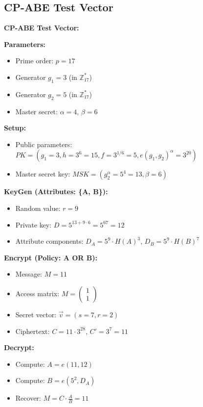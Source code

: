 \documentclass[11pt,a4paper]{article}
\begin{document}
\subsection{CP-ABE Test Vector}

\begin{examplebox}
\textbf{CP-ABE Test Vector:}

\textbf{Parameters:}
\begin{itemize}
    \item Prime order: $p = 17$
    \item Generator $g_1 = 3$ (in $\mathbb{Z}_{17}^*$)
    \item Generator $g_2 = 5$ (in $\mathbb{Z}_{17}^*$)
    \item Master secret: $\alpha = 4$, $\beta = 6$
\end{itemize}

\textbf{Setup:}
\begin{itemize}
    \item Public parameters: $PK = (g_1 = 3, h = 3^6 = 15, f = 3^{1/6} = 5, e(g_1, g_2)^\alpha = 3^{20})$
    \item Master secret key: $MSK = (g_2^\alpha = 5^4 = 13, \beta = 6)$
\end{itemize}

\textbf{KeyGen (Attributes: \{A, B\}):}
\begin{itemize}
    \item Random value: $r = 9$
    \item Private key: $D = 5^{13 + 9 \cdot 6} = 5^{67} = 12$
    \item Attribute components: $D_A = 5^9 \cdot H(A)^3$, $D_B = 5^9 \cdot H(B)^7$
\end{itemize}

\textbf{Encrypt (Policy: A OR B):}
\begin{itemize}
    \item Message: $M = 11$
    \item Access matrix: $M = \begin{pmatrix} 1 \\ 1 \end{pmatrix}$
    \item Secret vector: $\vec{v} = (s = 7, r = 2)$
    \item Ciphertext: $C = 11 \cdot 3^{28}$, $C' = 3^7 = 11$
\end{itemize}

\textbf{Decrypt:}
\begin{itemize}
    \item Compute: $A = e(11, 12)$
    \item Compute: $B = e(5^2, D_A)$
    \item Recover: $M = C \cdot \frac{A}{B} = 11$
\end{itemize}
\end{examplebox}
\end{document}
